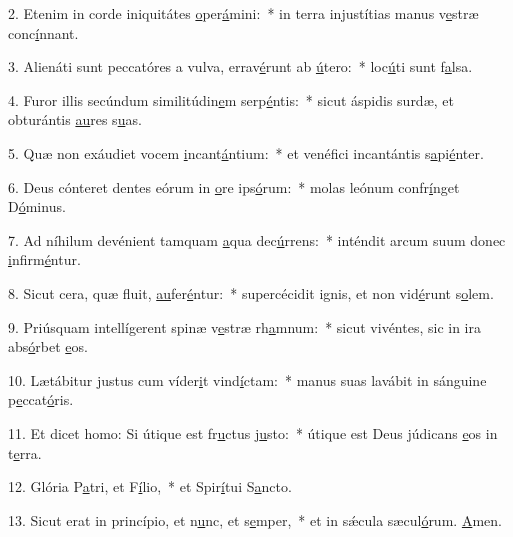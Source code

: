 2. Etenim in corde iniquitátes \uline{o}per\uline{á}mini:~* in terra injustítias manus v\uline{e}stræ conc\uline{í}nnant.\par 
3. Alienáti sunt peccatóres a vulva, errav\uline{é}runt ab \uline{ú}tero:~* loc\uline{ú}ti sunt f\uline{a}lsa.\par 
4. Furor illis secúndum similitúdin\uline{e}m serp\uline{é}ntis:~* sicut áspidis surdæ, et obturántis \uline{au}res s\uline{u}as.\par 
5. Quæ non exáudiet vocem \uline{i}ncant\uline{á}ntium:~* et venéfici incantántis s\uline{a}pi\uline{é}nter.\par 
6. Deus cónteret dentes eórum in \uline{o}re ips\uline{ó}rum:~* molas leónum confr\uline{í}nget D\uline{ó}minus.\par 
7. Ad níhilum devénient tamquam \uline{a}qua dec\uline{ú}rrens:~* inténdit arcum suum donec \uline{i}nfirm\uline{é}ntur.\par 
8. Sicut cera, quæ fluit, \uline{au}fer\uline{é}ntur:~* supercécidit ignis, et non vid\uline{é}runt s\uline{o}lem.\par 
9. Priúsquam intellígerent spinæ v\uline{e}stræ rh\uline{a}mnum:~* sicut vivéntes, sic in ira abs\uline{ó}rbet \uline{e}os.\par 
10. Lætábitur justus cum víder\uline{i}t vind\uline{í}ctam:~* manus suas lavábit in sánguine p\uline{e}ccat\uline{ó}ris.\par 
11. Et dicet homo: Si útique est fr\uline{u}ctus j\uline{u}sto:~* útique est Deus júdicans \uline{e}os in t\uline{e}rra.\par 
12. Glória P\uline{a}tri, et F\uline{í}lio,~* et Spir\uline{í}tui S\uline{a}ncto.\par 
13. Sicut erat in princípio, et n\uline{u}nc, et s\uline{e}mper,~* et in sǽcula sæcul\uline{ó}rum. \uline{A}men.\par 
